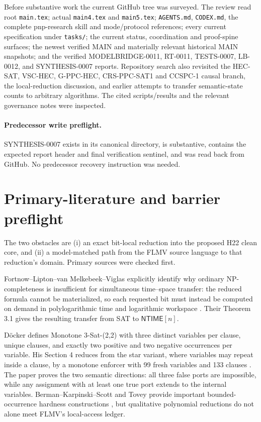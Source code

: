 \documentclass[11pt]{article}
\begin{document}
Before substantive work the current GitHub tree was surveyed.  The review
read root \texttt{main.tex}; actual \texttt{main4.tex} and \texttt{main5.tex};
\texttt{AGENTS.md}, \texttt{CODEX.md}, the complete pnp-research skill and
mode/protocol references; every current specification under \texttt{tasks/};
the current status, coordination and proof-spine surfaces; the newest verified
MAIN and materially relevant historical MAIN snapshots; and the verified
MODELBRIDGE-0011, RT-0011, TESTS-0007, LB-0012, and SYNTHESIS-0007 reports.
Repository search also revisited the HEC-SAT, VSC-HEC, G-PPC-HEC,
CRS-PPC-SAT1 and CCSPC-1 causal branch, the local-reduction discussion, and
earlier attempts to transfer semantic-state counts to arbitrary algorithms.
The cited scripts/results and the relevant governance notes were inspected.

\paragraph{Predecessor write preflight.}
SYNTHESIS-0007 exists in its canonical directory, is substantive, contains
the expected report header and final verification sentinel, and was read back
from GitHub.  No predecessor recovery instruction was needed.

\section{Primary-literature and barrier preflight}

The two obstacles are (i) an exact bit-local reduction into the proposed
H22 clean core, and (ii) a model-matched path from the FLMV source language to
that reduction's domain.  Primary sources were checked first.

Fortnow--Lipton--van Melkebeek--Viglas explicitly identify why ordinary
NP-completeness is insufficient for simultaneous time--space transfer: the
reduced formula cannot be materialized, so each requested bit must instead be
computed on demand in polylogarithmic time and logarithmic workspace
\cite{FLMV05}.  Their Theorem 3.1 gives the resulting transfer from SAT to
$\mathsf{NTIME}[n]$.

D\"ocker defines Monotone 3-Sat-(2,2) with three distinct variables per
clause, unique clauses, and exactly two positive and two negative occurrences
per variable.  His Section 4 reduces from the star variant, where variables
may repeat inside a clause, by a monotone enforcer with 99 fresh variables and
133 clauses \cite{Doecker19}.  The paper proves the two semantic directions:
all three false ports are impossible, while any assignment with at least one
true port extends to the internal variables.  Berman--Karpinski--Scott and
Tovey provide important bounded-occurrence hardness constructions
\cite{BKS03,Tovey84}, but qualitative polynomial reductions do not alone meet
FLMV's local-access ledger.
\end{document}
